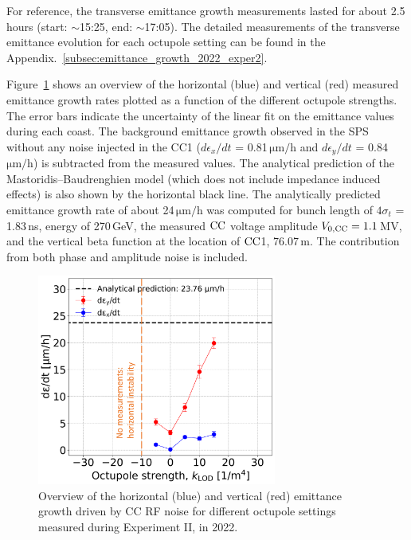 For reference, the transverse emittance growth measurements lasted for about 2.5\,hours (start: $\sim$15:25, end: $\sim$17:05). The detailed measurements of the transverse emittance evolution for each octupole setting can be found in the Appendix.~\ref{subsec:emittance_growth_2022_exper2}. 

Figure~\ref{fig:H_V_emit_growth_background_subtracted_octupole_scan} shows an overview of the horizontal (blue) and vertical (red) measured emittance growth rates plotted as a function of the different octupole strengths. The error bars indicate the uncertainty of the linear fit on the emittance values during each coast. The background emittance growth observed in the SPS without any noise injected in the CC1 ($d\epsilon_x/dt$ = 0.81\,$\mathrm{\mu m/h}$ and $d\epsilon_y/dt$ = 0.84\,$\mathrm{\mu m/h}$) is subtracted from the measured values. The analytical prediction of the Mastoridis--Baudrenghien model (which does not include impedance induced effects) is also shown by the horizontal black line. The analytically predicted emittance growth rate of about 24\,$\mathrm{\mu m/h}$ was computed for bunch length of $4 \sigma_t$ = 1.83\,ns, energy of 270\,GeV, the measured ${\mathrm{CC}}$ voltage amplitude ${V_\mathrm{0, CC}}=1.1$\,MV, and the vertical beta function at the location of ${\mathrm{CC}}$1, 76.07\,m. The contribution from both phase and amplitude noise is included. 

\begin{figure}[!h]
   \centering         
   \includegraphics[width=0.7\textwidth]{images/Ch8/emit_H_and_V_octupole_scan_background_growth_subtracted_modified.png}
       \caption{Overview of the horizontal (blue) and vertical (red) emittance growth driven by CC RF noise for different octupole settings measured during Experiment II, in 2022.}
       \label{fig:H_V_emit_growth_background_subtracted_octupole_scan}
\end{figure}


